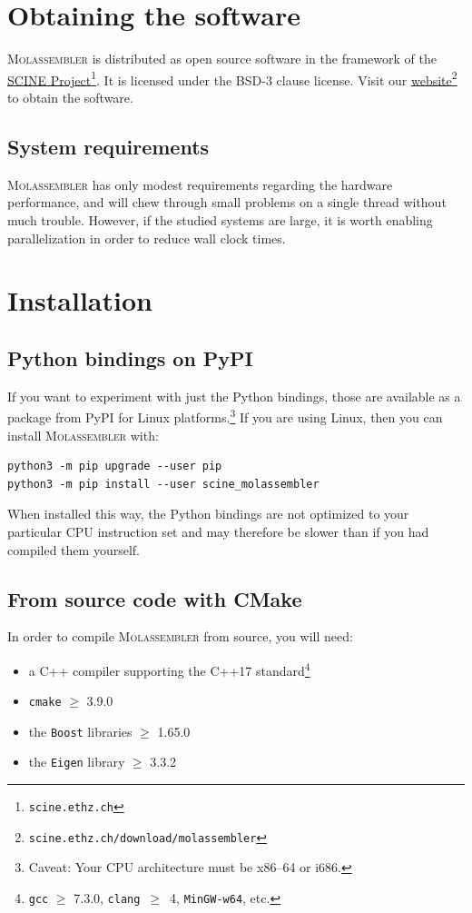 \documentclass[]{tufte-book}
\begin{document}
\chapter{Obtaining the software}\label{ch:obtain}

\textsc{Molassembler}  is distributed as open source software in the framework
of the \href{https://scine.ethz.ch/}{SCINE
Project}\footnote{\texttt{scine.ethz.ch}}. It is licensed under the BSD-3 clause
license. Visit our
\href{https://scine.ethz.ch/download/molassembler}{website}\footnote{\texttt{scine.ethz.ch/download/molassembler}}
to obtain the software. 


\section{System requirements}

\textsc{Molassembler} has only modest requirements regarding the hardware
performance, and will chew through small problems on a single thread without
much trouble. However, if the studied systems are large, it is worth enabling
parallelization in order to reduce wall clock times.


\chapter{Installation}\label{ch:installation}

\section{Python bindings on PyPI}

If you want to experiment with just the Python bindings, those are available as
a package from PyPI for Linux platforms.\footnote{Caveat: Your CPU architecture
must be x86--64 or i686.} If you are using Linux, then you can install
\textsc{Molassembler} with:

\begin{Verbatim}
python3 -m pip upgrade --user pip
python3 -m pip install --user scine_molassembler
\end{Verbatim}

When installed this way, the Python bindings are not optimized to your
particular CPU instruction set and may therefore be slower than if you had
compiled them yourself.

\section{From source code with CMake}
In order to compile \textsc{Molassembler} from source, you will need:
\begin{itemize}
  \item a C++ compiler supporting the C++17 standard\footnote{\texttt{gcc} $\ge$
    7.3.0, \texttt{clang}~$\ge$~4, \texttt{MinGW-w64}, etc.}
  \item \texttt{cmake} $\ge$ 3.9.0
  \item the \texttt{Boost} libraries $\ge$ 1.65.0
  \item the \texttt{Eigen} library $\ge$ 3.3.2
\end{itemize}
\end{document}
